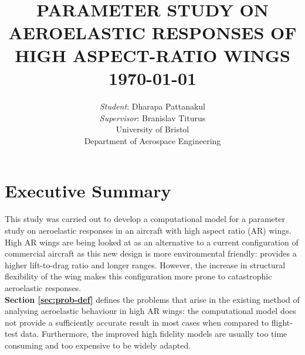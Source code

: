 \documentclass[11pt]{article}
\begin{document}
{\selectfont
\title{ \normalsize \textsc{}
		\\ [2.0cm]
		\HRule{0.5pt} \\
		\LARGE \textbf{\uppercase{Parameter Study on Aeroelastic Responses of  High Aspect-Ratio Wings}
		\HRule{2pt} \\ [0.5cm]
		\normalsize \today \vspace*{5\baselineskip}}
		}
}

\date{}

\author{
        \textit{Student}: Dharapa Pattanakul\\ 
        \textit{Supervisor}: Branislav Titurus\\
		University of Bristol \\
		Department of Aerospace Engineering }

\vfill
\titlepic{}
\maketitle
\thispagestyle{empty}


\newpage
{} 
\section*{Executive Summary}
This study was carried out to develop a computational model for a parameter study on aeroelastic responses in an aircraft with high aspect ratio (AR) wings. High AR wings are being looked at as an alternative to a current configuration of commercial aircraft as this new design is more environmental friendly: provides a higher lift-to-drag ratio and longer ranges. However, the increase in structural flexibility of the wing makes this configuration more prone to catastrophic aeroelastic responses.\\

\textbf{Section \ref{sec:prob-def}} defines the problems that arise in the existing method of analysing aeroelastic behaviour in high AR wings: the computational model does not provide a sufficiently accurate result in most cases when compared to flight-test data. Furthermore, the improved high fidelity models are usually too time consuming and too expensive to be widely adapted.\cite{Jones2015PreliminaryExperiment}\\
\end{document}
